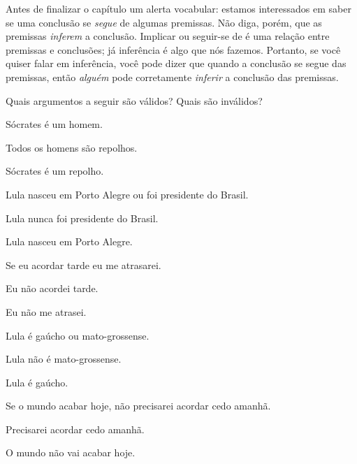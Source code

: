 Antes de finalizar o capítulo um alerta vocabular: estamos interessados em saber se uma conclusão se \emph{segue} de algumas premissas.
Não diga, porém, que as premissas \emph{inferem} a conclusão.
Implicar ou seguir-se de é uma relação entre premissas e conclusões; já inferência é algo que nós fazemos.
Portanto, se você quiser falar em inferência, você pode dizer que quando a conclusão se segue das premissas, então \emph{alguém} pode corretamente \emph{inferir} a conclusão das premissas.


\practiceproblems
\problempart
Quais argumentos a seguir são válidos? Quais são inválidos?

\begin{earg}
\item Sócrates é um homem.
\item Todos os homens são repolhos.
\item[\therefore] Sócrates é um repolho.
\end{earg}

\begin{earg}
\item  Lula nasceu em Porto Alegre ou foi presidente do Brasil.
\item Lula nunca foi presidente do Brasil.
\item[\therefore] Lula nasceu em Porto Alegre.
\end{earg}

\begin{earg}
\item Se eu acordar tarde eu me atrasarei.
\item Eu não acordei tarde.
\item[\therefore] Eu não me atrasei.
\end{earg}

\begin{earg}
\item Lula é gaúcho ou mato-grossense.
\item Lula não é mato-grossense.
\item[\therefore] Lula é gaúcho.
\end{earg}

\begin{earg}
\item Se o mundo acabar hoje, não precisarei acordar cedo amanhã.
\item Precisarei acordar cedo amanhã.
\item[\therefore] O mundo não vai acabar hoje.
\end{earg}


